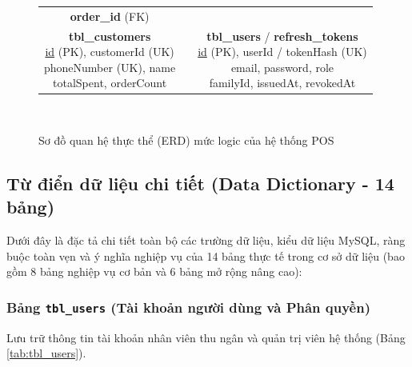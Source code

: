 \begin{figure}[H]
\begin{minipage}{0.95\textwidth}
{{\begin{tabularx}{\textwidth}{ccc}
{{            \textbf{order\_id} (FK)}} \\[8mm]
            \fbox{\parbox{3.5cm}{\centering \textbf{tbl\_customers}\\
            \underline{id} (PK), customerId (UK)\\
            phoneNumber (UK), name\\
            totalSpent, orderCount}}
            & &
            \fbox{\parbox{4.5cm}{\centering \textbf{tbl\_users} / \textbf{refresh\_tokens}\\
            \underline{id} (PK), userId / tokenHash (UK)\\
            email, password, role\\
            familyId, issuedAt, revokedAt}} \\[2mm]
        \end{tabularx}\\[2mm]
    }
}
\end{minipage}
\caption{Sơ đồ quan hệ thực thể (ERD) mức logic của hệ thống POS}
\label{fig:erd_diagram}
\end{figure}

\subsection{Từ điển dữ liệu chi tiết (Data Dictionary - 14 bảng)}
Dưới đây là đặc tả chi tiết toàn bộ các trường dữ liệu, kiểu dữ liệu MySQL, ràng buộc toàn vẹn và ý nghĩa nghiệp vụ của 14 bảng thực tế trong cơ sở dữ liệu (bao gồm 8 bảng nghiệp vụ cơ bản và 6 bảng mở rộng nâng cao):

\subsubsection{Bảng \texttt{tbl\_users} (Tài khoản người dùng và Phân quyền)}
Lưu trữ thông tin tài khoản nhân viên thu ngân và quản trị viên hệ thống (Bảng \ref{tab:tbl_users}).

